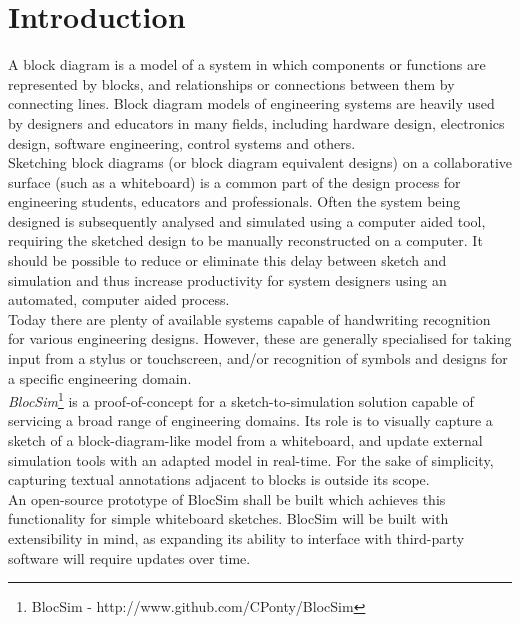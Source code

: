 \mainmatter


\chapter{Introduction}

A block diagram is a model of a system in which components or functions are represented by blocks, and relationships or connections between them by connecting lines. Block diagram models of engineering systems are heavily used by designers and educators in many fields, including hardware design, electronics design, software engineering, control systems and others.
\\

Sketching block diagrams (or block diagram equivalent designs) on a collaborative surface (such as a whiteboard) is a common part of the design process for engineering students, educators and professionals. Often the system being designed is subsequently analysed and simulated using a computer aided tool, requiring the sketched design to be manually reconstructed on a computer. It should be possible to reduce or eliminate this delay between sketch and simulation and thus increase productivity for system designers using an automated, computer aided process.
\\

Today there are plenty of available systems capable of handwriting recognition for various engineering designs. However, these are generally specialised for taking input from a stylus or touchscreen, and/or recognition of symbols and designs for a specific engineering domain.
\\

\textit{BlocSim}\footnote{BlocSim - http://www.github.com/CPonty/BlocSim} is a proof-of-concept for a sketch-to-simulation solution capable of servicing a broad range of engineering domains. Its role is to visually capture a sketch of a block-diagram-like model from a whiteboard, and update external simulation tools with an adapted model in real-time. For the sake of simplicity, capturing textual annotations adjacent to blocks is outside its scope.
\\

An open-source prototype of BlocSim shall be built which achieves this functionality for simple whiteboard sketches. BlocSim will be built with extensibility in mind, as expanding its ability to interface with third-party software will require updates over time.


